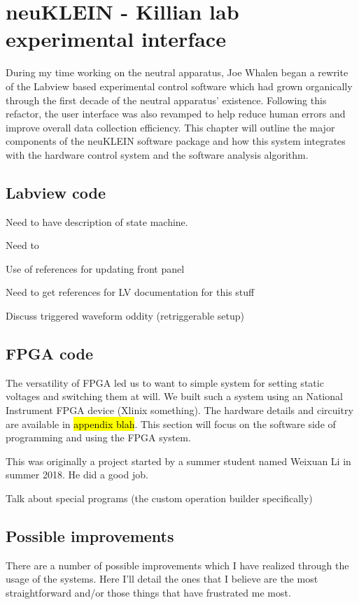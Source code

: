 \chapter{neuKLEIN - Killian lab experimental interface} 
\label{app:neuKLEIN}
During my time working on the neutral apparatus, Joe Whalen began a rewrite of the Labview based experimental control software which had grown organically through the first decade of the neutral apparatus' existence. 
Following this refactor, the user interface was also revamped to help reduce human errors and improve overall data collection efficiency. 
This chapter will outline the major components of the neuKLEIN software package and how this system integrates with the hardware control system and the software analysis algorithm.

\section{Labview code}
Need to have description of state machine.

Need to 

Use of references for updating front panel

Need to get references for LV documentation for this stuff

Discuss triggered waveform oddity (retriggerable setup)




\section{FPGA code}
The versatility of FPGA led us to want to simple system for setting static voltages and switching them at will. We built such a system using an National Instrument FPGA device (Xlinix something). The hardware details and circuitry are available in \hl{appendix blah}. This section will focus on the software side of programming and using the FPGA system.

This was originally a project started by a summer student named Weixuan Li in summer 2018. He did a good job.

Talk about special programs (the custom operation builder specifically)

\section{Possible improvements}
There are a number of possible improvements which I have realized through the usage of the systems.
Here I'll detail the ones that I believe are the most straightforward and/or those things that have frustrated me most.

